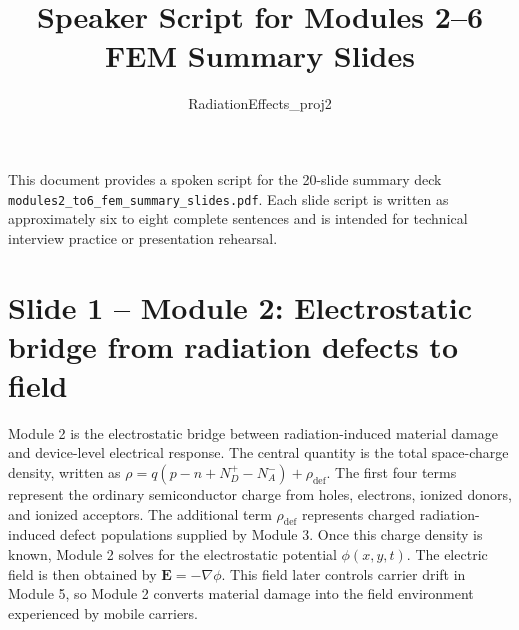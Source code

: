 \documentclass[11pt]{article}
\title{Speaker Script for Modules 2--6 FEM Summary Slides}
\author{RadiationEffects\_proj2}
\date{}
\newcommand{\grad}{\nabla}
\newcommand{\E}{\bm{E}}
\begin{document}
\maketitle

\begin{center}
\begin{tcolorbox}[colback=softblue,colframe=deepblue,width=0.92\textwidth]
This document provides a spoken script for the 20-slide summary deck \texttt{modules2\_to6\_fem\_summary\_slides.pdf}. Each slide script is written as approximately six to eight complete sentences and is intended for technical interview practice or presentation rehearsal.
\end{tcolorbox}
\end{center}

\tableofcontents
\newpage

\section*{Slide 1 -- Module 2: Electrostatic bridge from radiation defects to field}
\begin{scriptbox}
Module 2 is the electrostatic bridge between radiation-induced material damage and device-level electrical response. The central quantity is the total space-charge density, written as \(\rho=q(p-n+N_D^+-N_A^-)+\rho_{\mathrm{def}}\). The first four terms represent the ordinary semiconductor charge from holes, electrons, ionized donors, and ionized acceptors. The additional term \(\rho_{\mathrm{def}}\) represents charged radiation-induced defect populations supplied by Module 3. Once this charge density is known, Module 2 solves for the electrostatic potential \(\phi(x,y,t)\). The electric field is then obtained by \(\E=-\grad\phi\). This field later controls carrier drift in Module 5, so Module 2 converts material damage into the field environment experienced by mobile carriers.
\end{scriptbox}
\end{document}
